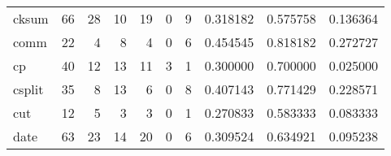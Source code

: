 \begin{longtable}{lrrrrrrrrr}
cksum     &                                      66 &                                                 28 &                                                 10 &                                                 19 &                                                  0 &                                                  9 &                                           0.318182 &                               0.575758 &                             0.136364 \\
comm      &                                      22 &                                                  4 &                                                  8 &                                                  4 &                                                  0 &                                                  6 &                                           0.454545 &                               0.818182 &                             0.272727 \\
cp        &                                      40 &                                                 12 &                                                 13 &                                                 11 &                                                  3 &                                                  1 &                                           0.300000 &                               0.700000 &                             0.025000 \\
csplit    &                                      35 &                                                  8 &                                                 13 &                                                  6 &                                                  0 &                                                  8 &                                           0.407143 &                               0.771429 &                             0.228571 \\
cut       &                                      12 &                                                  5 &                                                  3 &                                                  3 &                                                  0 &                                                  1 &                                           0.270833 &                               0.583333 &                             0.083333 \\
date      &                                      63 &                                                 23 &                                                 14 &                                                 20 &                                                  0 &                                                  6 &                                           0.309524 &                               0.634921 &                             0.095238 \\

\end{longtable}
